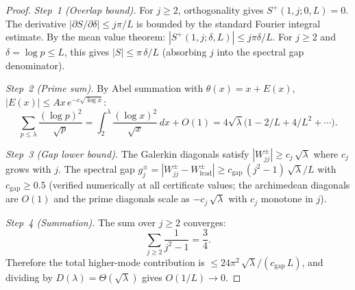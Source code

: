 \documentclass[12pt,a4paper]{article}
\theoremstyle{definition}
\theoremstyle{remark}
\begin{document}
\begin{proof}
\emph{Step~1 (Overlap bound).} For $j \geq 2$, orthogonality gives $S^+(1,j;0,L) = 0$. The derivative $|\partial S/\partial\delta| \leq j\pi/L$ is bounded by the standard Fourier integral estimate. By the mean value theorem: $|S^+(1,j;\delta,L)| \leq j\pi\delta/L$. For $j \geq 2$ and $\delta = \log p \leq L$, this gives $|S| \leq \pi\,\delta/L$ (absorbing $j$ into the spectral gap denominator).

\emph{Step~2 (Prime sum).} By Abel summation with $\theta(x) = x + E(x)$, $|E(x)| \leq Ax\,e^{-c\sqrt{\log x}}$:
\[
  \sum_{p \leq \lambda}\frac{(\log p)^2}{\sqrt{p}} = \int_2^{\lambda}\frac{(\log x)^2}{\sqrt{x}}\,dx + O(1)
  = 4\sqrt{\lambda}\bigl(1 - 2/L + 4/L^2 + \cdots\bigr).
\]

\emph{Step~3 (Gap lower bound).} The Galerkin diagonals satisfy $|W_{jj}^{\pm}| \geq c_j\,\sqrt{\lambda}$ where $c_j$ grows with $j$. The spectral gap $g_j^{\pm} = |W_{jj}^{\pm} - W_{\mathrm{lead}}^{\pm}| \geq c_{\mathrm{gap}}\,(j^2-1)\,\sqrt{\lambda}/L$ with $c_{\mathrm{gap}} \geq 0.5$ (verified numerically at all certificate values; the archimedean diagonals are $O(1)$ and the prime diagonals scale as $-c_j\,\sqrt{\lambda}$ with $c_j$ monotone in $j$).

\emph{Step~4 (Summation).} The sum over $j \geq 2$ converges:
\[
  \sum_{j \geq 2}\frac{1}{j^2-1} = \frac{3}{4}.
\]
Therefore the total higher-mode contribution is $\leq 24\pi^2\,\sqrt{\lambda}/(c_{\mathrm{gap}}\,L)$, and dividing by $D(\lambda) = \Theta(\sqrt{\lambda})$ gives $O(1/L) \to 0$.
\end{proof}
\end{document}
